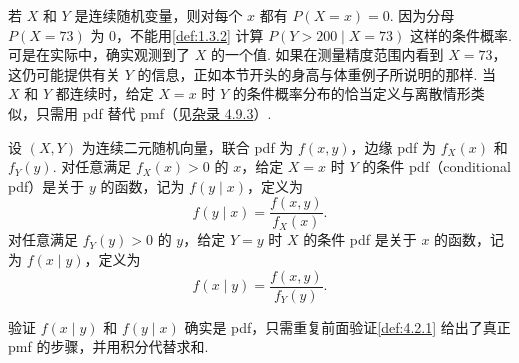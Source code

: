 若 $X$ 和 $Y$ 是连续随机变量，则对每个 $x$ 都有 $P(X=x)=0$. 因为分母 $P(X=73)$ 为 0，不能用\autoref{def:1.3.2} 计算 $P(Y>200\mid X=73)$ 这样的条件概率. 可是在实际中，确实观测到了 $X$ 的一个值. 如果在测量精度范围内看到 $X=73$，这仍可能提供有关 $Y$ 的信息，正如本节开头的身高与体重例子所说明的那样. 当 $X$ 和 $Y$ 都连续时，给定 $X=x$ 时 $Y$ 的条件概率分布的恰当定义与离散情形类似，只需用 pdf 替代 pmf（见\hyperref[misc:4.9.3]{杂录 4.9.3}）.
\begin{definition}\label{def:4.2.3}
设 $(X,Y)$ 为连续二元随机向量，联合 pdf 为 $f(x,y)$，边缘 pdf 为 $f_X(x)$ 和 $f_Y(y)$. 对任意满足 $f_X(x)>0$ 的 $x$，给定 $X=x$ 时 $Y$ 的条件 pdf（conditional pdf）是关于 $y$ 的函数，记为 $f(y\mid x)$，定义为
$$f(y\mid x)=\frac{f(x,y)}{f_X(x)}.$$
对任意满足 $f_Y(y)>0$ 的 $y$，给定 $Y=y$ 时 $X$ 的条件 pdf 是关于 $x$ 的函数，记为 $f(x\mid y)$，定义为
$$f(x\mid y)=\frac{f(x,y)}{f_Y(y)}.$$
\end{definition}
验证 $f(x\mid y)$ 和 $f(y\mid x)$ 确实是 pdf，只需重复前面验证\autoref{def:4.2.1} 给出了真正 pmf 的步骤，并用积分代替求和.

